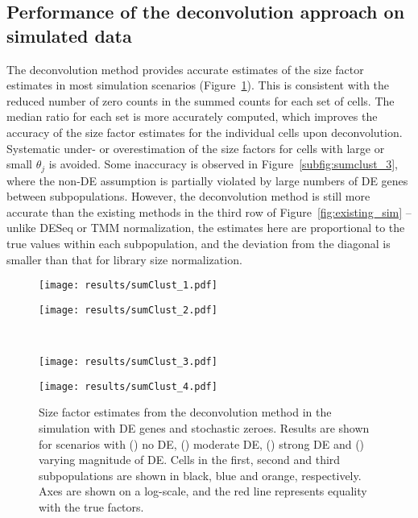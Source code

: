 \documentclass{article}
\begin{document}
\subsection{Performance of the deconvolution approach on simulated data}
The deconvolution method provides accurate estimates of the size factor estimates in most simulation scenarios (Figure~\ref{fig:sim_cluster_DE}).
This is consistent with the reduced number of zero counts in the summed counts for each set of cells.
The median ratio for each set is more accurately computed, which improves the accuracy of the size factor estimates for the individual cells upon deconvolution.
Systematic under- or overestimation of the size factors for cells with large or small $\theta_j$ is avoided.
Some inaccuracy is observed in Figure~\ref{subfig:sumclust_3}, where the non-DE assumption is partially violated by large numbers of DE genes between subpopulations.
However, the deconvolution method is still more accurate than the existing methods in the third row of Figure~\ref{fig:existing_sim}
    -- unlike DESeq or TMM normalization, the estimates here are proportional to the true values within each subpopulation, 
       and the deviation from the diagonal is smaller than that for library size normalization.

\begin{figure}[btp]
\begin{center}
\begin{minipage}{0.33\textwidth}
    \texttt{[image: results/sumClust\_1.pdf]}
    \subcaption{}\label{subfig:sumclust_1}
\end{minipage}
\begin{minipage}{0.33\textwidth}
    \texttt{[image: results/sumClust\_2.pdf]}
    \subcaption{}\label{subfig:sumclust_2}
\end{minipage}  \\ 
\begin{minipage}{0.33\textwidth}
    \texttt{[image: results/sumClust\_3.pdf]}
    \subcaption{}\label{subfig:sumclust_3}
\end{minipage}
\begin{minipage}{0.33\textwidth}
    \texttt{[image: results/sumClust\_4.pdf]}
    \subcaption{}\label{subfig:sumclust_4}
\end{minipage}
\end{center}
    \caption{
        Size factor estimates from the deconvolution method in the simulation with DE genes and stochastic zeroes.
        Results are shown for scenarios with () no DE, () moderate DE, 
                () strong DE and () varying magnitude of DE.
        Cells in the first, second and third subpopulations are shown in black, blue and orange, respectively.
        Axes are shown on a log-scale, and the red line represents equality with the true factors.
    }
    \label{fig:sim_cluster_DE}
\end{figure}
\end{document}
